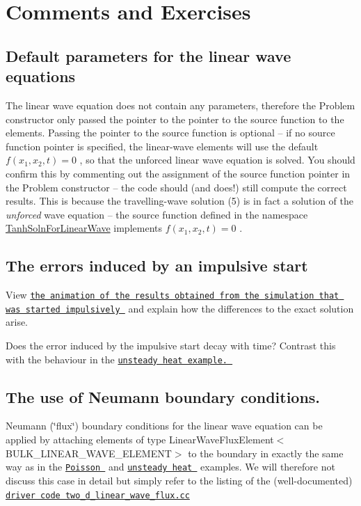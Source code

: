 \hypertarget{index_comments}{}\section{Comments and Exercises}\label{index_comments}
\hypertarget{index_default}{}\subsection{Default parameters for the linear wave equations}\label{index_default}
The linear wave equation does not contain any parameters, therefore the {\ttfamily Problem} constructor only passed the pointer to the pointer to the source function to the elements. Passing the pointer to the source function is optional -- if no source function pointer is specified, the linear-\/wave elements will use the default $ f(x_1,x_2,t)=0 $ , so that the unforced linear wave equation is solved. You should confirm this by commenting out the assignment of the source function pointer in the Problem constructor -- the code should (and does!) still compute the correct results. This is because the travelling-\/wave solution (5) is in fact a solution of the {\itshape unforced} wave equation -- the source function defined in the namespace {\ttfamily \hyperlink{namespaceTanhSolnForLinearWave}{Tanh\+Soln\+For\+Linear\+Wave}} implements $ f(x_1,x_2,t)=0 $ .\hypertarget{index_imp_soln}{}\subsection{The errors induced by an impulsive start}\label{index_imp_soln}

\begin{DoxyEnumerate}
\item View \href{../figures/impulsive_wave_solution.avi}{\tt the animation of the results obtained from the simulation that was started impulsively } and explain how the differences to the exact solution arise.
\item Does the error induced by the impulsive start decay with time? Contrast this with the behaviour in the \href{../../../unsteady_heat/two_d_unsteady_heat/html/index.html}{\tt unsteady heat example. }
\end{DoxyEnumerate}\hypertarget{index_flux}{}\subsection{The use of Neumann boundary conditions.}\label{index_flux}
Neumann (\char`\"{}flux\char`\"{}) boundary conditions for the linear wave equation can be applied by attaching elements of type {\ttfamily Linear\+Wave\+Flux\+Element$<$\+B\+U\+L\+K\+\_\+\+L\+I\+N\+E\+A\+R\+\_\+\+W\+A\+V\+E\+\_\+\+E\+L\+E\+M\+E\+N\+T$>$} to the boundary in exactly the same way as in the \href{../../../poisson/two_d_poisson_flux_bc2/html/index.html}{\tt Poisson } and \href{../../../unsteady_heat/two_d_unsteady_heat_adapt/html/index.html}{\tt unsteady heat } examples. We will therefore not discuss this case in detail but simply refer to the listing of the (well-\/documented) \href{../../../../demo_drivers/linear_wave/two_d_linear_wave/two_d_linear_wave_flux.cc}{\tt driver code two\+\_\+d\+\_\+linear\+\_\+wave\+\_\+flux.\+cc}



